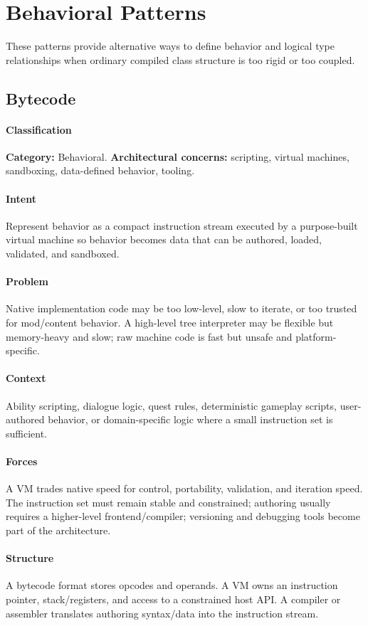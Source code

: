 \documentclass[11pt]{article}
\begin{document}
\section{Behavioral Patterns}\label{sec:behavioral}
These patterns provide alternative ways to define behavior and logical type relationships when ordinary compiled class structure is too rigid or too coupled.

\subsection{Bytecode}\label{pat:bytecode}
\paragraph{Classification} \textbf{Category:} Behavioral. \textbf{Architectural concerns:} scripting, virtual machines, sandboxing, data-defined behavior, tooling.
\paragraph{Intent} Represent behavior as a compact instruction stream executed by a purpose-built virtual machine so behavior becomes data that can be authored, loaded, validated, and sandboxed.
\paragraph{Problem} Native implementation code may be too low-level, slow to iterate, or too trusted for mod/content behavior. A high-level tree interpreter may be flexible but memory-heavy and slow; raw machine code is fast but unsafe and platform-specific.
\paragraph{Context} Ability scripting, dialogue logic, quest rules, deterministic gameplay scripts, user-authored behavior, or domain-specific logic where a small instruction set is sufficient.
\paragraph{Forces} A VM trades native speed for control, portability, validation, and iteration speed. The instruction set must remain stable and constrained; authoring usually requires a higher-level frontend/compiler; versioning and debugging tools become part of the architecture.
\paragraph{Structure} A bytecode format stores opcodes and operands. A VM owns an instruction pointer, stack/registers, and access to a constrained host API. A compiler or assembler translates authoring syntax/data into the instruction stream.
\end{document}

